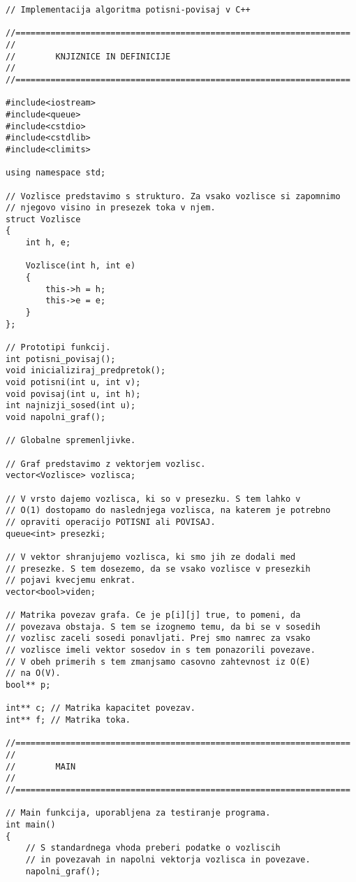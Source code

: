 \documentclass[mat1]{fmfdelo}
\begin{document}
\begin{verbatim}
// Implementacija algoritma potisni-povisaj v C++

//===================================================================
//
//        KNJIZNICE IN DEFINICIJE
//
//===================================================================

#include<iostream>
#include<queue>
#include<cstdio>
#include<cstdlib>
#include<climits>

using namespace std;

// Vozlisce predstavimo s strukturo. Za vsako vozlisce si zapomnimo
// njegovo visino in presezek toka v njem.
struct Vozlisce
{
    int h, e;
    
    Vozlisce(int h, int e)
    {
        this->h = h;
        this->e = e;
    }
};

// Prototipi funkcij.
int potisni_povisaj();
void inicializiraj_predpretok();
void potisni(int u, int v);
void povisaj(int u, int h);
int najnizji_sosed(int u);
void napolni_graf();

// Globalne spremenljivke.

// Graf predstavimo z vektorjem vozlisc.
vector<Vozlisce> vozlisca;

// V vrsto dajemo vozlisca, ki so v presezku. S tem lahko v
// O(1) dostopamo do naslednjega vozlisca, na katerem je potrebno
// opraviti operacijo POTISNI ali POVISAJ.
queue<int> presezki;

// V vektor shranjujemo vozlisca, ki smo jih ze dodali med
// presezke. S tem dosezemo, da se vsako vozlisce v presezkih
// pojavi kvecjemu enkrat.
vector<bool>viden;

// Matrika povezav grafa. Ce je p[i][j] true, to pomeni, da
// povezava obstaja. S tem se izognemo temu, da bi se v sosedih
// vozlisc zaceli sosedi ponavljati. Prej smo namrec za vsako
// vozlisce imeli vektor sosedov in s tem ponazorili povezave.
// V obeh primerih s tem zmanjsamo casovno zahtevnost iz O(E)
// na O(V).
bool** p;

int** c; // Matrika kapacitet povezav.
int** f; // Matrika toka.

//===================================================================
//
//        MAIN
//
//===================================================================

// Main funkcija, uporabljena za testiranje programa.
int main()
{
    // S standardnega vhoda preberi podatke o vozliscih
    // in povezavah in napolni vektorja vozlisca in povezave.
    napolni_graf();
        

\end{verbatim}
\end{document}
